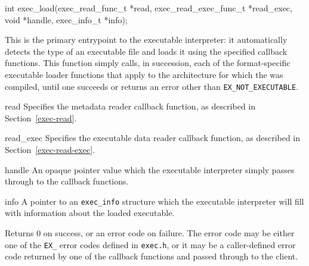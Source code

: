 \begin{apisyn}

	\funcproto int exec_load(exec_read_func_t *read,
				 exec_read_exec_func_t *read_exec,
				 void *handle, \outparam exec_info_t *info);
\end{apisyn}
\begin{apidesc}
	This is the primary entrypoint to the executable interpreter:
	it automatically detects the type of an executable file
	and loads it using the specified callback functions.
	This function simply calls, in succession,
	each of the format-specific executable loader functions
	that apply to the architecture
	for which the \oskit{} was compiled,
	until one succeeds or returns an error
	other than \texttt{EX_NOT_EXECUTABLE}.
\end{apidesc}
\begin{apiparm}
	\item[read]
		Specifies the metadata reader callback function,
		as described in Section~\ref{exec-read}.
	\item[read_exec]
		Specifies the executable data reader callback function,
		as described in Section~\ref{exec-read-exec}.
	\item[handle]
		An opaque pointer value
		which the executable interpreter
		simply passes through to the callback functions.
	\item[info]
		A pointer to an \texttt{exec_info} structure
		which the executable interpreter will fill
		with information about the loaded executable.
\end{apiparm}
\begin{apiret}
	Returns 0 on success,
	or an error code on failure.
	The error code may be either
	one of the \texttt{EX_} error codes
	defined in \texttt{exec.h},
	or it may be a caller-defined error code
	returned by one of the callback functions
	and passed through to the client.
\end{apiret}

